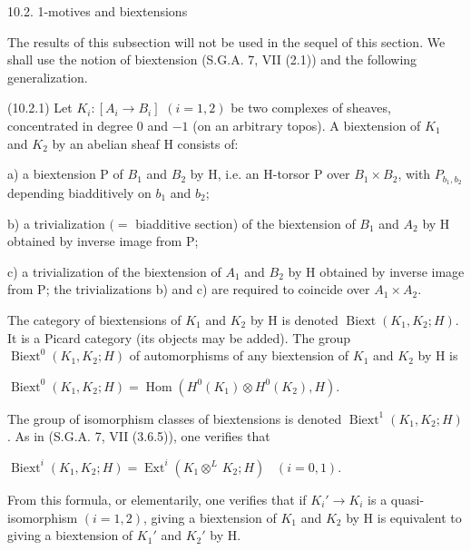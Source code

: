 \documentclass[11pt,twoside]{article}
\newcommand{\DFormula}[1]{%
  \par\smallskip\noindent\hspace*{0pt}\(\displaystyle #1\)\par\smallskip
}
\begin{document}
10.2. 1-motives and biextensions\par
\par\medskip
The results of this subsection will not be used in the sequel of this section. We shall use the notion of biextension (S.G.A. 7, VII (2.1)) and the following generalization.\par
\par\medskip
(10.2.1) Let \(K_{i}:[A_{i}\to B_{i}]\) \((i=1,2)\) be two complexes of sheaves, concentrated in degree 0 and \(−1\) (on an arbitrary topos). A biextension of \(K_{1}\) and \(K_{2}\) by an abelian sheaf H consists of:\par
\par\medskip
a) a biextension P of \(B_{1}\) and \(B_{2}\) by H, i.e. an H-torsor P over \(B_{1}\times B_{2}\), with \(P_{b_{1},b_{2}}\) depending biadditively on \(b_{1}\) and \(b_{2}\);\par
b) a trivialization \((=\) biadditive section) of the biextension of \(B_{1}\) and \(A_{2}\) by H obtained by inverse image from P;\par
c) a trivialization of the biextension of \(A_{1}\) and \(B_{2}\) by H obtained by inverse image from P; the trivializations b) and c) are required to coincide over \(A_{1}\times A_{2}\).\par
\par\medskip
The category of biextensions of \(K_{1}\) and \(K_{2}\) by H is denoted \(\operatorname{Biext}(K_{1},K_{2};H)\). It is a Picard category (its objects may be added). The group \(\operatorname{Biext}^{0}(K_{1},K_{2};H)\) of automorphisms of any biextension of \(K_{1}\) and \(K_{2}\) by H is\par
\par\medskip
\DFormula{\operatorname{Biext}^{0}(K_{1},K_{2};H)=\operatorname{Hom}(H^{0}(K_{1})\otimes H^{0}(K_{2}),H).}
\par\medskip
The group of isomorphism classes of biextensions is denoted \(\operatorname{Biext}^{1}(K_{1},K_{2};H)\). As in (S.G.A. 7, VII (3.6.5)), one verifies that\par
\par\medskip
\DFormula{\operatorname{Biext}^{i}(K_{1},K_{2};H)=\operatorname{Ext}^{i}(K_{1}\otimes ^{L}\,K_{2};H)\,\,\,\,\,(i=0,1).}
\par\medskip
From this formula, or elementarily, one verifies that if \(K_{i}′\to K_{i}\) is a quasi-isomorphism \((i=1,2)\), giving a biextension of \(K_{1}\) and \(K_{2}\) by H is equivalent to giving a biextension of \(K_{1}′\) and \(K_{2}′\) by H.\par
\end{document}
